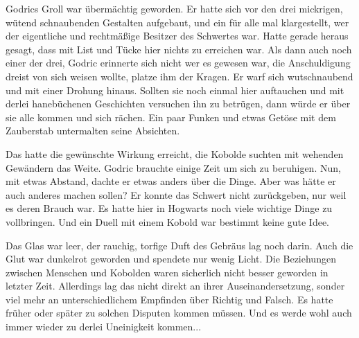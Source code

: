 \documentclass[fontsize=12pt]{scrartcl}
\begin{document}
	Godrics Groll war übermächtig geworden. Er hatte sich vor den drei mickrigen, wütend schnaubenden Gestalten aufgebaut, und ein für alle mal klargestellt, wer der eigentliche und rechtmäßige Besitzer des Schwertes war. Hatte gerade heraus gesagt, dass mit List und Tücke hier nichts zu erreichen war. Als dann auch noch einer der drei, Godric erinnerte sich nicht wer es gewesen war, die Anschuldigung dreist von sich weisen wollte, platze ihm der Kragen. Er warf sich wutschnaubend und mit einer Drohung hinaus. Sollten sie noch einmal hier auftauchen und mit derlei hanebüchenen Geschichten versuchen ihn zu betrügen, dann würde er über sie alle kommen und sich rächen. Ein paar Funken und etwas Getöse mit dem Zauberstab untermalten seine Absichten.
	
	Das hatte die gewünschte Wirkung erreicht, die Kobolde suchten mit wehenden Gewändern das Weite. Godric brauchte einige Zeit um sich zu beruhigen. Nun, mit etwas Abstand, dachte er etwas anders über die Dinge. Aber was hätte er auch anderes machen sollen? Er konnte das Schwert nicht zurückgeben, nur weil es deren Brauch war. Es hatte hier in Hogwarts noch viele wichtige Dinge zu vollbringen. Und ein Duell mit einem Kobold war bestimmt keine gute Idee. 
	
	Das Glas war leer, der rauchig, torfige Duft des Gebräus lag noch darin. Auch die Glut war dunkelrot geworden und spendete nur wenig Licht. Die Beziehungen zwischen Menschen und Kobolden waren sicherlich nicht besser geworden in letzter Zeit. Allerdings lag das nicht direkt an ihrer Auseinandersetzung, sonder viel mehr an unterschiedlichem Empfinden über Richtig und Falsch. Es hatte früher oder später zu solchen Disputen kommen müssen. Und es werde wohl auch immer wieder zu derlei Uneinigkeit kommen...
	
	
\end{document}
